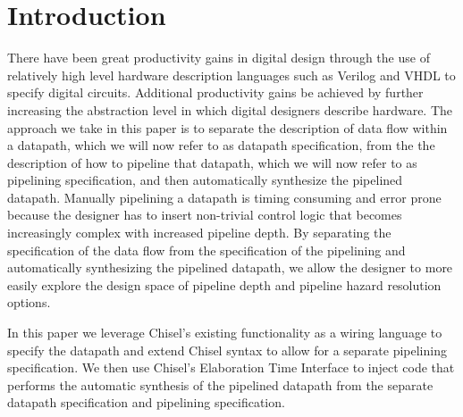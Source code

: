 \section{Introduction}
There have been great productivity gains in digital design through the use of relatively high level hardware description languages such as Verilog and VHDL to specify digital circuits. Additional productivity gains be achieved by further increasing the abstraction level in which digital designers describe hardware. The approach we take in this paper is to separate the description of data flow within a datapath, which we will now refer to as datapath specification, from the the description of how to pipeline that datapath, which we will now refer to as pipelining specification, and then automatically synthesize the pipelined datapath. Manually pipelining a datapath is timing consuming and error prone because the designer has to insert non-trivial control logic that becomes increasingly complex with increased pipeline depth. By separating the specification of the data flow from the specification of the pipelining and automatically synthesizing the pipelined datapath, we allow the designer to more easily explore the design space of pipeline depth and pipeline hazard resolution options. 

In this paper we leverage Chisel's existing functionality as a wiring language to specify the datapath and extend Chisel syntax to allow for a separate pipelining specification. We then use Chisel's Elaboration Time Interface to inject code that performs the automatic synthesis of the pipelined datapath from the separate datapath specification and pipelining specification.

\cite{Bachrach-2012}
